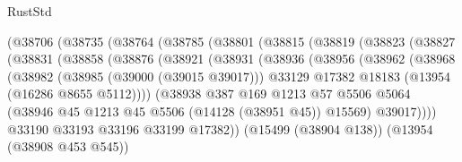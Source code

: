 \begin{lexlean}{RustStd}
\begin{coremodule}
                    (@38706
                      (@38735
                        (@38764
                          (@38785
                            (@38801
                              (@38815
                                (@38819
                                  (@38823
                                    (@38827
                                      (@38831
                                        (@38858
                                          (@38876
                                            (@38921
                                              (@38931
                                                (@38936
                                                  (@38956
                                                    (@38962
                                                      (@38968
                                                        (@38982
                                                          (@38985 (@39000 (@39015 @39017)))
                                                          @33129
                                                          @17382
                                                          @18183
                                                          (@13954 (@16286 @8655 @5112))))
                                                      (@38938
                                                        @387
                                                        @169
                                                        @1213
                                                        @57
                                                        @5506
                                                        @5064
                                                        (@38946
                                                          @45
                                                          @1213
                                                          @45
                                                          @5506
                                                          (@14128 (@38951 @45))
                                                          @15569)
                                                        @39017))))
                                                @33190
                                                @33193
                                                @33196
                                                @33199
                                                @17382))
                                            (@15499 (@38904 @138))
                                            (@13954 (@38908 @453 @545))

\end{coremodule}
\end{lexlean}
